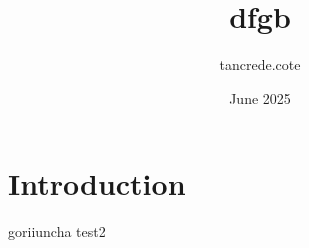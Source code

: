 \documentclass{article}
\title{dfgb}
\author{tancrede.cote }
\date{June 2025}
\begin{document}
\maketitle








\section{Introduction}


goriiuncha test2
\end{document}
